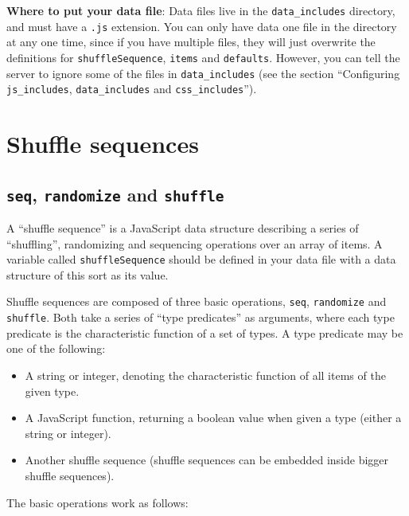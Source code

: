 \documentclass[]{article}
\begin{document}
\textbf{Where to put your data file}: Data files live in the
\texttt{data\_includes} directory, and must have a \texttt{.js}
extension. You can only have data one file in the directory at any one
time, since if you have multiple files, they will just overwrite the
definitions for \texttt{shuffleSequence}, \texttt{items} and
\texttt{defaults}. However, you can tell the server to ignore some of
the files in \texttt{data\_includes} (see the section ``Configuring
\texttt{js\_includes}, \texttt{data\_includes} and
\texttt{css\_includes}'').

\section{Shuffle sequences}\label{shuffle-sequences}

\subsection{\texorpdfstring{\texttt{seq}, \texttt{randomize} and
\texttt{shuffle}}{seq, randomize and shuffle}}\label{seq-randomize-and-shuffle}

A ``shuffle sequence'' is a JavaScript data structure describing a
series of ``shuffling'', randomizing and sequencing operations over an
array of items. A variable called \texttt{shuffleSequence} should be
defined in your data file with a data structure of this sort as its
value.

Shuffle sequences are composed of three basic operations, \texttt{seq},
\texttt{randomize} and \texttt{shuffle}. Both take a series of ``type
predicates'' as arguments, where each type predicate is the
characteristic function of a set of types. A type predicate may be one
of the following:

\begin{itemize}
\item
  A string or integer, denoting the characteristic function of all items
  of the given type.
\item
  A JavaScript function, returning a boolean value when given a type
  (either a string or integer).
\item
  Another shuffle sequence (shuffle sequences can be embedded inside
  bigger shuffle sequences).
\end{itemize}

The basic operations work as follows:
\end{document}
